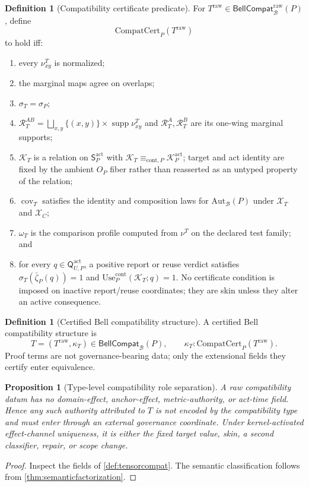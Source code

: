 \documentclass[11pt]{article}
\newtheorem{proposition}[theorem]{Proposition}
\theoremstyle{definition}
\newtheorem{definition}[theorem]{Definition}
\newcommand{\Bell}{\mathcal{B}}
\newcommand{\AutBell}{\mathrm{Aut}_{\Bell}(P)}
\newcommand{\BellCompatRaw}{\mathsf{BellCompat}^{\mathrm{raw}}_{\Bell}(P)}
\newcommand{\BellCompat}{\mathsf{BellCompat}_{\Bell}(P)}
\newcommand{\CompatCert}{\mathrm{CompatCert}_{P}}
\newcommand{\Active}{\mathrm{act}}
\newcommand{\ContEq}{\equiv_{\mathrm{cont},P}}
\newcommand{\ContUse}{\mathrm{Use}^{\mathrm{cont}}_{P}}
\begin{document}
\begin{definition}[Compatibility certificate predicate]\label{def:compatcertificate}
For $T^{\mathrm{raw}}\in\BellCompatRaw$, define
\[
\CompatCert(T^{\mathrm{raw}})
\]
to hold iff:
\begin{enumerate}[label=(C\arabic*),leftmargin=3em]
\item every $\nu^T_{xy}$ is normalized;
\item the marginal maps agree on overlaps;
\item $\sigma_T=\sigma_P$;
\item $\mathcal R_T^{AB}=\bigsqcup_{x,y}\{(x,y)\}\times\operatorname{supp}\nu^T_{xy}$ and $\mathcal R_T^A,\mathcal R_T^B$ are its one-wing marginal supports;
\item $\mathcal K_T$ is a relation on $\mathsf S_P^{\Active}$ with $\mathcal K_T\ContEq\mathcal K_P^{\Active}$; target and act identity are fixed by the ambient $O_P$ fiber rather than reasserted as an untyped property of the relation;
\item $\operatorname{cov}_T$ satisfies the identity and composition laws for $\AutBell$ under $\mathscr X_T$ and $\mathscr X_C$;
\item $\omega_T$ is the comparison profile computed from $\nu^T$ on the declared test family; and
\item for every $q\in\mathsf Q_{U,P}^{\Active}$, a positive report or reuse verdict satisfies $\sigma_T(\bar\zeta_P(q))=1$ and $\ContUse(\mathcal K_T;q)=1$. No certificate condition is imposed on inactive report/reuse coordinates; they are skin unless they alter an active consequence.
\end{enumerate}
\end{definition}

\begin{definition}[Certified Bell compatibility structure]\label{def:certifiedcompatibility}
A certified Bell compatibility structure is
\[
T=(T^{\mathrm{raw}},\kappa_T)\in\BellCompat,
\qquad \kappa_T:\CompatCert(T^{\mathrm{raw}}).
\]
Proof terms are not governance-bearing data; only the extensional fields they certify enter equivalence.
\end{definition}

\begin{proposition}[Type-level compatibility role separation]\label{prop:compattyperoleseparation}
A raw compatibility datum has no domain-effect, anchor-effect, metric-authority, or act-time field. Hence any such authority attributed to $T$ is not encoded by the compatibility type and must enter through an external governance coordinate. Under kernel-activated effect-channel uniqueness, it is either the fixed target value, skin, a second classifier, repair, or scope change.
\end{proposition}
\begin{proof}
Inspect the fields of \cref{def:tensorcompat}. The semantic classification follows from \cref{thm:semanticfactorization}.
\end{proof}
\end{document}
